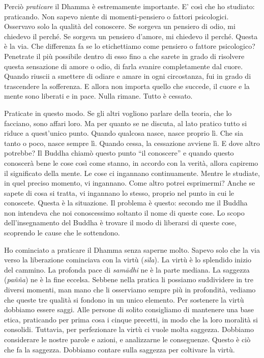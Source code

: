 Perciò \emph{praticare} il Dhamma è estremamente importante. E' così che
ho studiato: praticando. Non sapevo niente di momenti-pensiero o fattori
psicologici. Osservavo solo la qualità del conoscere. Se sorgeva un
pensiero di odio, mi chiedevo il perché. Se sorgeva un pensiero d'amore,
mi chiedevo il perché. Questa è la via. Che differenza fa se lo
etichettiamo come pensiero o fattore psicologico? Penetrate il più
possibile dentro di esso fino a che sarete in grado di risolvere questa
sensazione di amore o odio, di farla svanire completamente dal cuore.
Quando riuscii a smettere di odiare e amare in ogni circostanza, fui in
grado di trascendere la sofferenza. E allora non importa quello che
succede, il cuore e la mente sono liberati e in pace. Nulla rimane.
Tutto è cessato.

Praticate in questo modo. Se gli altri vogliono parlare della teoria,
che lo facciano, sono affari loro. Ma per quanto se ne discuta, al lato
pratico tutto si riduce a quest'unico punto. Quando qualcosa nasce,
nasce proprio lì. Che sia tanto o poco, nasce sempre lì. Quando cessa,
la cessazione avviene lì. E dove altro potrebbe? Il Buddha chiamò questo
punto ``il conoscere'' e quando questo conoscerà bene le cose così come
stanno, in accordo con la verità, allora capiremo il significato della
mente. Le cose ci ingannano continuamente. Mentre le studiate, in quel
preciso momento, vi ingannano. Come altro potrei esprimermi? Anche se
sapete di cosa si tratta, vi ingannano lo stesso, proprio nel punto in
cui le conoscete. Questa è la situazione. Il problema è questo: secondo
me il Buddha non intendeva che noi conoscessimo soltanto il nome di
queste cose. Lo scopo dell'insegnamento del Buddha è trovare il modo di
liberarsi di queste cose, scoprendo le cause che le sottendono.


Ho cominciato a praticare il Dhamma senza saperne molto. Sapevo solo che
la via verso la liberazione cominciava con la virtù (\emph{sīla}).%
La virtù è lo splendido inizio del cammino. La profonda pace di
\emph{samādhi}%
ne è la parte mediana. La saggezza
(\emph{pañña}) ne è la fine eccelsa. Sebbene nella pratica li possiamo
suddividere in tre diversi momenti, man mano che li osserviamo sempre
più in profondità, vediamo che queste tre qualità si fondono in un unico
elemento. Per sostenere la virtù dobbiamo essere saggi. Alle persone di
solito consigliamo di mantenere una base etica, praticando per prima
cosa i cinque precetti, in modo che la loro moralità si consolidi.
Tuttavia, per perfezionare la virtù ci vuole molta saggezza. Dobbiamo
considerare le nostre parole e azioni, e analizzarne le conseguenze.
Questo è ciò che fa la saggezza. Dobbiamo contare sulla saggezza per
coltivare la virtù.

